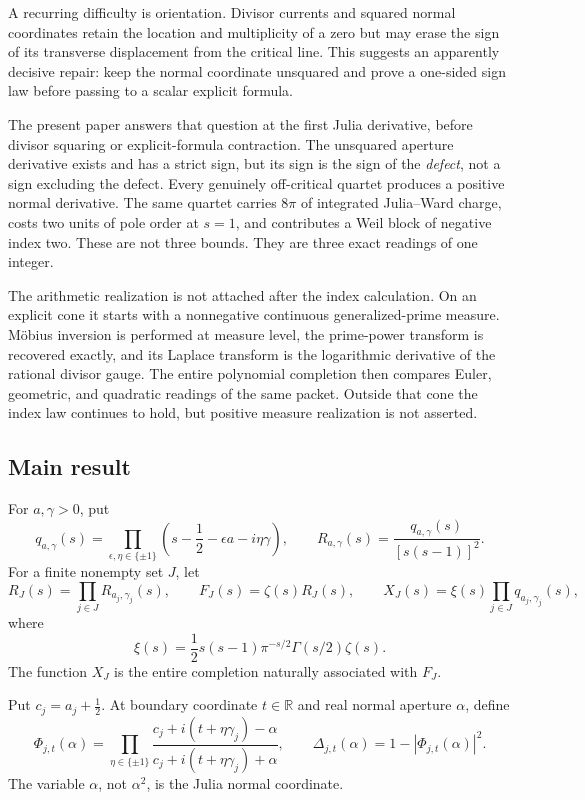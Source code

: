 \documentclass[11pt]{article}
\newcommand{\R}{\mathbb R}
\begin{document}
A recurring difficulty is orientation.  Divisor currents and squared
normal coordinates retain the location and multiplicity of a zero but may
erase the sign of its transverse displacement from the critical line.
This suggests an apparently decisive repair: keep the normal coordinate
unsquared and prove a one-sided sign law before passing to a scalar
explicit formula.

The present paper answers that question at the first Julia derivative,
before divisor squaring or explicit-formula contraction.  The unsquared
aperture derivative exists and has a strict sign, but its sign is the sign
of the \emph{defect}, not a sign excluding the defect.  Every genuinely
off-critical quartet produces a positive normal derivative.  The same
quartet carries \(8\pi\) of integrated Julia--Ward charge, costs two units
of pole order at \(s=1\), and contributes a Weil block of negative index
two.  These are not three bounds.  They are three exact readings of one
integer.

The arithmetic realization is not attached after the index calculation.
On an explicit cone it starts with a nonnegative continuous
generalized-prime measure.  M\"obius inversion is performed at measure
level, the prime-power transform is recovered exactly, and its Laplace
transform is the logarithmic derivative of the rational divisor gauge.
The entire polynomial completion then compares Euler, geometric, and
quadratic readings of the same packet.  Outside that cone the index law
continues to hold, but positive measure realization is not asserted.

\subsection{Main result}

For \(a,\gamma>0\), put
\[
 q_{a,\gamma}(s)
 =\prod_{\epsilon,\eta\in\{\pm1\}}
   \left(s-\frac12-\epsilon a-i\eta\gamma\right),
 \qquad
 R_{a,\gamma}(s)
 =\frac{q_{a,\gamma}(s)}{[s(s-1)]^2}.
\]
For a finite nonempty set \(J\), let
\[
 R_J(s)=\prod_{j\in J}R_{a_j,\gamma_j}(s),
 \qquad
 F_J(s)=\zeta(s)R_J(s),
 \qquad
 X_J(s)=\xi(s)\prod_{j\in J}q_{a_j,\gamma_j}(s),
\]
where
\[
 \xi(s)=\frac12s(s-1)\pi^{-s/2}\Gamma(s/2)\zeta(s).
\]
The function \(X_J\) is the entire completion naturally associated with
\(F_J\).

Put \(c_j=a_j+\frac12\).  At boundary coordinate \(t\in\R\) and real
normal aperture \(\alpha\), define
\[
 \Phi_{j,t}(\alpha)
 =\prod_{\eta\in\{\pm1\}}
   \frac{c_j+i(t+\eta\gamma_j)-\alpha}
        {c_j+i(t+\eta\gamma_j)+\alpha},
 \qquad
 \Delta_{j,t}(\alpha)=1-|\Phi_{j,t}(\alpha)|^2.
\]
The variable \(\alpha\), not \(\alpha^2\), is the Julia normal coordinate.
\end{document}
